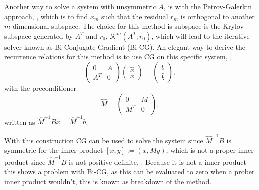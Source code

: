 Another way to solve a system with unsymmetric \(A\), is with the Petrov-Galerkin approach, \cite{Vorst03}, which is to find \(x_m\) such that the residual \(r_m\) is orthogonal to another \(m\)-dimensional subspace. The choice for this method is subspace is the Krylov subspace generated by \(A^T\) and \(r_0\), \(\mathcal{K}^m(A^T;r_0)\), which will lead to the iterative solver known as Bi-Conjugate Gradient (Bi-CG). An elegant way to derive the recurrence relations for this method is to use CG on this specific system, \cite{Vorst03},
\begin{equation}
    \begin{pmatrix}
    0 & A \\ A^T & 0
    \end{pmatrix}
    \begin{pmatrix}
    \hat{x} \\ x
    \end{pmatrix}
    = \begin{pmatrix}
    b \\ \hat{b}
    \end{pmatrix},
\end{equation}
with the preconditioner
\begin{equation}
    \hat{M}=\begin{pmatrix}
    0 & M \\ M^T & 0
    \end{pmatrix},
\end{equation}
written as \(\hat{M}^{-1}B\tilde{x}=\hat{M}^{-1}\tilde{b}\).

With this construction CG can be used to solve the system since \(\hat{M}^{-1}B\) is symmetric for the inner product \([x,y]:=(x,My)\), which is not a proper inner product since \(\hat{M}^{-1}B\) is not positive definite, \cite{Vorst03}. Because it is not a inner product this shows a problem with Bi-CG, as this can be evaluated to zero when a prober inner product wouldn't, this is known as breakdown of the method.

